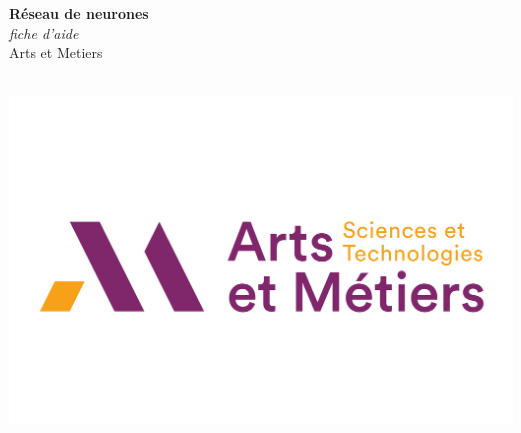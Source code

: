 \documentclass[a0,portrait]{a0poster}
\begin{document}


\begin{minipage}[b]{0.75\linewidth}
  \veryHuge \color{NavyBlue} \textbf{Réseau de neurones} \color{Black}\\ %
\Huge\textit{fiche d'aide}\\[2cm] %
\huge Arts et Metiers\\[0.4cm] %
\\
\end{minipage}
%
\begin{minipage}[b]{0.25\linewidth}
\includegraphics[width=20cm]{logo.png}\\
\end{minipage}

\vspace{1cm} %


\end{document}
